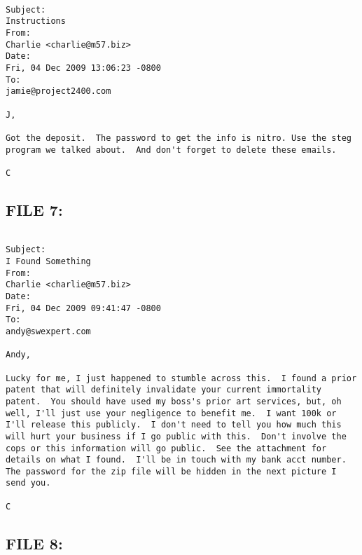 \begin{lstlisting}

Subject:
Instructions
From:
Charlie <charlie@m57.biz>
Date:
Fri, 04 Dec 2009 13:06:23 -0800
To:
jamie@project2400.com

J,

Got the deposit.  The password to get the info is nitro. Use the steg program we talked about.  And don't forget to delete these emails.

C

\end{lstlisting}

\subsection{FILE 7:}
\label{sec:charlie_daten_7}

\begin{lstlisting}

Subject:
I Found Something
From:
Charlie <charlie@m57.biz>
Date:
Fri, 04 Dec 2009 09:41:47 -0800
To:
andy@swexpert.com

Andy,

Lucky for me, I just happened to stumble across this.  I found a prior patent that will definitely invalidate your current immortality patent.  You should have used my boss's prior art services, but, oh well, I'll just use your negligence to benefit me.  I want 100k or I'll release this publicly.  I don't need to tell you how much this will hurt your business if I go public with this.  Don't involve the cops or this information will go public.  See the attachment for details on what I found.  I'll be in touch with my bank acct number.  The password for the zip file will be hidden in the next picture I send you.

C

\end{lstlisting}

\subsection{FILE 8:}
\label{sec:charlie_daten_8}




